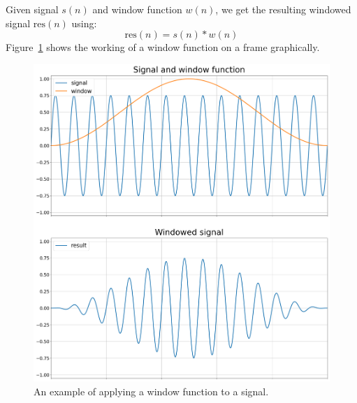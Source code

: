 \documentclass[a4paper,10pt,twocolumn]{article}
\begin{document}
Given signal $s(n)$ and window function $w(n)$, we get the resulting windowed signal $\text{res}(n)$ using:
\[ \text{res}(n) = s(n) * w(n) \]
Figure~\ref{fig:windowfunc} shows the working of a window function on a frame graphically.
\begin{figure}[h]
    \centering
    \includegraphics[width=\linewidth]{fig/window.png}
    \caption{An example of applying a window function to a signal.}
    \label{fig:windowfunc}
\end{figure}
\end{document}
